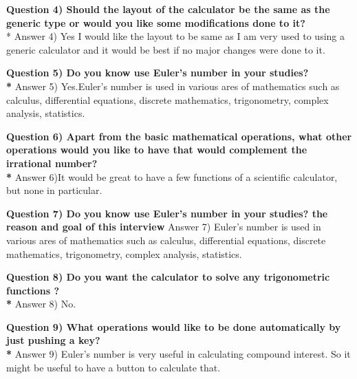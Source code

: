 \documentclass{article}
\begin{document}
\noindent \textbf{Question 4) Should the layout of the calculator be the same as the generic type or would you like some modifications done to it?}\\*
\noindent Answer 4) Yes I would like the layout to be same as I am very used to using a generic calculator and it would be best if no major changes were done to it. 
\begin{flushleft}
\hrulefill
\end{flushleft}

\noindent \textbf{Question 5) Do you know use Euler's number in your studies?\\*}
\noindent Answer 5) Yes.Euler's number is used in various ares of mathematics such as calculus, differential equations, discrete mathematics, trigonometry, complex analysis, statistics.
\begin{flushleft}
\hrulefill
\end{flushleft}

\noindent \textbf {Question 6) Apart from the basic mathematical operations, what other operations would you like to have that would complement the     irrational number? \\*}
\noindent Answer 6)It would be great to have a few functions of a scientific calculator, but none in particular. 
\begin{flushleft}
\hrulefill
\end{flushleft}
\noindent \textbf {Question 7) Do you know use Euler's number in your studies? the reason and goal of this interview  }
\noindent Answer 7) Euler's number is used in various ares of mathematics such as calculus, differential equations, discrete mathematics, trigonometry, complex analysis, statistics.
\begin{flushleft}
\hrulefill
\end{flushleft}

\noindent \textbf {Question 8) Do you want the calculator to solve any trigonometric functions ?\\*}
\noindent Answer 8) No.
\begin{flushleft}
\hrulefill
\end{flushleft}

\noindent \textbf {Question 9) What operations would like to be done automatically by just pushing a key?\\*}
\noindent Answer 9) Euler's number is very useful in calculating compound interest. So it might be useful to have a button to calculate that.
\begin{flushleft}
\hrulefill
\end{flushleft}
\end{document}
